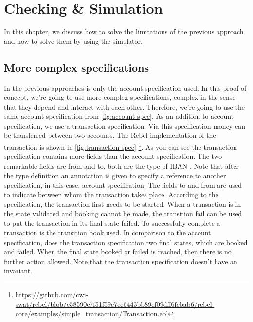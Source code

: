 \chapter{Checking \& Simulation}
\label{sec:ch5}

In this chapter, we discuss how to solve the limitations of the previous
approach and how to solve them by using the simulator.

\section{More complex specifications}
In the previous approaches is only the account specification used. In this proof
of concept, we're going to use more complex specifications, complex in the sense
that they depend and interact with each other. Therefore, we're going to use the
same account specification from \autoref{fig:account-spec}. As an addition to
account specification, we use a transaction specification. Via this
specification money can be transferred between two accounts.
The Rebel implementation of the transaction is shown in
\autoref{fig:transaction-spec} \footnote{\url{https://github.com/cwi-swat/rebel/blob/e58590c7f51f59e7ee6443bb89ef09dff6febab6/rebel-core/examples/simple_transaction/Transaction.ebl}}.
As you can see the transaction specification contains more fields than the
account specification. The two remarkable fields are from and to, both are the
type of IBAN . Note that after the type definition an annotation
is given to specify a reference to another specification, in this case, account
specification. The fields to and from are used to indicate between whom the
transaction takes place. According to the specification, the transaction first
needs to be started. When a transaction is in the state validated and booking
cannot be made, the transition fail can be used to put the transaction in its
final state failed. To successfully complete a transaction is the transition
book used. In comparison to the account specification, does the transaction
specification two final states, which are booked and failed. When the final
state booked or failed is reached, then there is no further action allowed.
Note that the transaction specification doesn't have an invariant.

